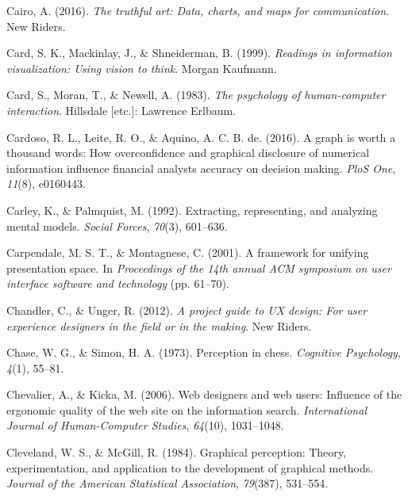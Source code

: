 \documentclass[print]{nuthesis}
\newlength{\cslhangindent}
\newenvironment{CSLReferences}[2]%
{\setlength{\parindent}{0pt}%
\everypar{\setlength{\hangindent}{\cslhangindent}}\ignorespaces}%
{\par}
\begin{document}
\begin{CSLReferences}{1}{0}
\leavevmode{}%
Cairo, A. (2016). \emph{The truthful art: Data, charts, and maps for communication}. New Riders.

\leavevmode{}%
Card, S. K., Mackinlay, J., \& Shneiderman, B. (1999). \emph{Readings in information visualization: Using vision to think}. Morgan Kaufmann.

\leavevmode{}%
Card, S., Moran, T., \& Newell, A. (1983). \emph{The psychology of human-computer interaction}. Hillsdale {[}etc.{]}: Lawrence Erlbaum.

\leavevmode{}%
Cardoso, R. L., Leite, R. O., \& Aquino, A. C. B. de. (2016). A graph is worth a thousand words: How overconfidence and graphical disclosure of numerical information influence financial analysts accuracy on decision making. \emph{PloS One}, \emph{11}(8), e0160443.

\leavevmode{}%
Carley, K., \& Palmquist, M. (1992). Extracting, representing, and analyzing mental models. \emph{Social Forces}, \emph{70}(3), 601--636.

\leavevmode{}%
Carpendale, M. S. T., \& Montagnese, C. (2001). A framework for unifying presentation space. In \emph{Proceedings of the 14th annual ACM symposium on user interface software and technology} (pp. 61--70).

\leavevmode{}%
Chandler, C., \& Unger, R. (2012). \emph{A project guide to UX design: For user experience designers in the field or in the making}. New Riders.

\leavevmode{}%
Chase, W. G., \& Simon, H. A. (1973). Perception in chess. \emph{Cognitive Psychology}, \emph{4}(1), 55--81.

\leavevmode{}%
Chevalier, A., \& Kicka, M. (2006). Web designers and web users: Influence of the ergonomic quality of the web site on the information search. \emph{International Journal of Human-Computer Studies}, \emph{64}(10), 1031--1048.

\leavevmode{}%
Cleveland, W. S., \& McGill, R. (1984). Graphical perception: Theory, experimentation, and application to the development of graphical methods. \emph{Journal of the American Statistical Association}, \emph{79}(387), 531--554.


\end{CSLReferences}
\end{document}
